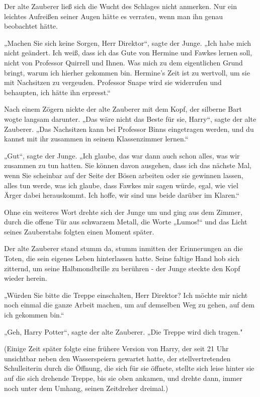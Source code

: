 {Der alte Zauberer ließ sich die Wucht des Schlages nicht anmerken. Nur ein leichtes Aufreißen seiner Augen hätte es verraten, wenn man ihn genau beobachtet hätte.

„Machen Sie sich keine Sorgen, Herr Direktor“, sagte der Junge. „Ich habe mich nicht geändert. Ich weiß, dass ich das Gute von Hermine und Fawkes lernen soll, nicht von Professor Quirrell und Ihnen. Was mich zu dem eigentlichen Grund bringt, warum ich hierher gekommen bin. Hermine's Zeit ist zu wertvoll, um sie mit Nachsitzen zu vergeuden. Professor Snape wird sie widerrufen und behaupten, ich hätte ihn erpresst.“

Nach einem Zögern nickte der alte Zauberer mit dem Kopf, der silberne Bart wogte langsam darunter. „Das wäre nicht das Beste für sie, Harry“, sagte der alte Zauberer. „Das Nachsitzen kann bei Professor Binns eingetragen werden, und du kannst mit ihr zusammen in seinem Klassenzimmer lernen.“

„Gut“, sagte der Junge. „Ich glaube, das war dann auch schon alles, was wir zusammen zu tun hatten. Sie können davon ausgehen, dass ich das nächste Mal, wenn Sie scheinbar auf der Seite der Bösen arbeiten oder sie gewinnen lassen, alles tun werde, was ich glaube, dass Fawkes mir sagen würde, egal, wie viel Ärger dabei herauskommt. Ich hoffe, wir sind uns beide darüber im Klaren.“

Ohne ein weiteres Wort drehte sich der Junge um und ging aus dem Zimmer, durch die offene Tür aus schwarzem Metall, die Worte „Lumos!“ und das Licht seines Zauberstabs folgten einen Moment später.

Der alte Zauberer stand stumm da, stumm inmitten der Erinnerungen an die Toten, die sein eigenes Leben hinterlassen hatte. Seine faltige Hand hob sich zitternd, um seine Halbmondbrille zu berühren - der Junge steckte den Kopf wieder herein.

„Würden Sie bitte die Treppe einschalten, Herr Direktor? Ich möchte mir nicht noch einmal die ganze Arbeit machen, um auf demselben Weg zu gehen, auf dem ich gekommen bin.“

„Geh, Harry Potter“, sagte der alte Zauberer. „Die Treppe wird dich tragen."

(Einige Zeit später folgte eine frühere Version von Harry, der seit 21 Uhr unsichtbar neben den Wasserspeiern gewartet hatte, der stellvertretenden Schulleiterin durch die Öffnung, die sich für sie öffnete, stellte sich leise hinter sie auf die sich drehende Treppe, bis sie oben ankamen, und drehte dann, immer noch unter dem Umhang, seinen Zeitdreher dreimal.)

}

